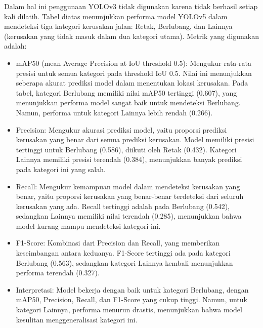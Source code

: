 \documentclass[12pt,a4paper]{article}
\begin{document}
\begin{adjustwidth}{3em}{0pt} 
Dalam hal ini penggunaan YOLOv3 tidak digunakan karena tidak berhasil setiap kali dilatih. Tabel diatas menunjukkan performa model YOLOv5 dalam mendeteksi tiga kategori kerusakan jalan: Retak, Berlubang, dan Lainnya (kerusakan yang tidak masuk dalam dua kategori utama). Metrik yang digunakan adalah:

\begin{itemize}
    \item mAP50 (mean Average Precision at IoU threshold 0.5): Mengukur rata-rata presisi untuk semua kategori pada threshold IoU 0.5. Nilai ini menunjukkan seberapa akurat prediksi model dalam menentukan lokasi kerusakan. Pada tabel, kategori Berlubang memiliki nilai mAP50 tertinggi (0.607), yang menunjukkan performa model sangat baik untuk mendeteksi Berlubang. Namun, performa untuk kategori Lainnya lebih rendah (0.266).
    
    \item Precision: Mengukur akurasi prediksi model, yaitu proporsi prediksi kerusakan yang benar dari semua prediksi kerusakan. Model memiliki presisi tertinggi untuk Berlubang (0.586), diikuti oleh Retak (0.432). Kategori Lainnya memiliki presisi terendah (0.384), menunjukkan banyak prediksi pada kategori ini yang salah.
    
    \item Recall: Mengukur kemampuan model dalam mendeteksi kerusakan yang benar, yaitu proporsi kerusakan yang benar-benar terdeteksi dari seluruh kerusakan yang ada. Recall tertinggi adalah pada Berlubang (0.542), sedangkan Lainnya memiliki nilai terendah (0.285), menunjukkan bahwa model kurang mampu mendeteksi kategori ini.
    
    \item F1-Score: Kombinasi dari Precision dan Recall, yang memberikan keseimbangan antara keduanya. F1-Score tertinggi ada pada kategori Berlubang (0.563), sedangkan kategori Lainnya kembali menunjukkan performa terendah (0.327).
    
    \item Interpretasi: Model bekerja dengan baik untuk kategori Berlubang, dengan mAP50, Precision, Recall, dan F1-Score yang cukup tinggi. Namun, untuk kategori Lainnya, performa menurun drastis, menunjukkan bahwa model kesulitan menggeneralisasi kategori ini. 
\end{itemize}
\end{adjustwidth}
\end{document}
